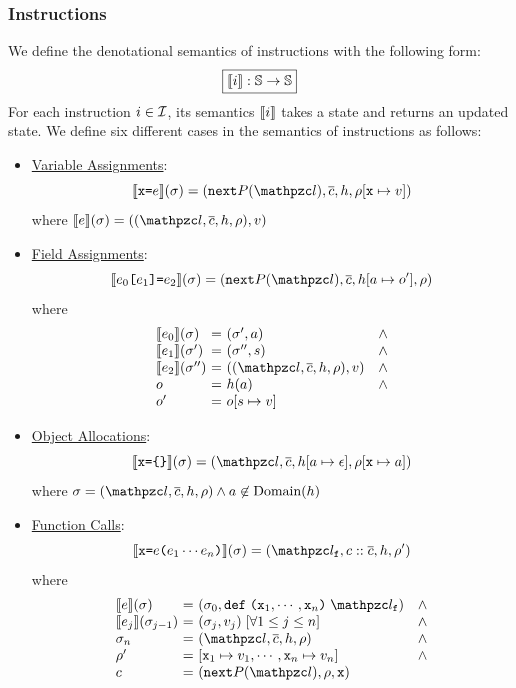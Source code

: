 \documentclass[10pt,conference]{IEEEtran}
\begin{document}
\subsubsection{Instructions} We define the denotational semantics of instructions
with the following form:
\[
  \framebox{$\sem{\inst}: \stset \rightarrow \stset$}
\]
For each instruction $i \in \mathcal{I}$, its semantics $\llbracket{i}\rrbracket$ takes a
state and returns an updated state. We define six different cases in the
semantics of instructions as follows:

\begin{itemize}
  \item \underline{Variable Assignments}:
    \[
      \sem{\varx \kweq \expr}(\st) =
      (\getnext{\prog}(\lab), \ctxts, \heap, \env[\varx \mapsto \val])
    \]
    where $\sem{\expr}(\st) = ((\lab, \ctxts, \heap, \env), \val)$

  \item \underline{Field Assignments}:
    \[
      \sem{\expr_0 \kwsl \expr_1 \kwsr \kweq \expr_2}(\st) =
      (\getnext{\prog}(\lab), \ctxts, \heap[\addr \mapsto \obj'], \env)
    \]
    where
    \[
      \begin{array}{l@{~}c@{~}ll}
        \sem{\expr_0}(\st) &=& (\st', \addr) &\wedge\\
        \sem{\expr_1}(\st') &=& (\st'', \str) &\wedge\\
        \sem{\expr_2}(\st'') &=& ((\lab, \ctxts, \heap, \env), \val) &\wedge\\
        \obj &=& \heap(\addr) &\wedge\\
        \obj' &=& \obj[\str \mapsto \val]\\
      \end{array}
    \]

  \item \underline{Object Allocations}:
    \[
      \sem{\varx \kweq \kwcl \kwcr}(\st) =
      (\lab, \ctxts, \heap[\addr \mapsto \epsilon], \env[\varx \mapsto
      \addr])
    \]
    where $\st = (\lab, \ctxts, \heap, \env) \wedge \addr \not\in
    \text{Domain}(\heap)$

  \item \underline{Function Calls}:
    \[
      \sem{\varx \kweq \expr \kwrl \expr_1 \cdots \expr_n \kwrr}(\st) =
      (\lab_\varf, \ctxt :: \ctxts, \heap, \env')
    \]
    where
    \[
      \begin{array}{l@{~}c@{~}ll}
        \sem{\expr}(\st) &=& (\st_0, \kwdef \; \kwrl \varx_1, \cdots, \varx_n
        \kwrr \; \lab_\varf) &\wedge\\
        \sem{\expr_j}(\st_{j-1}) &=& (\st_j, \val_j) \;
        [\forall 1 \leq j \leq n] &\wedge\\
        \st_n &=& (\lab, \ctxts, \heap, \env) &\wedge\\
        \env' &=& [\varx_1 \mapsto \val_1, \cdots, \varx_n \mapsto \val_n]
        &\wedge\\
        \ctxt &=& (\getnext{\prog}(\lab), \env, \varx)\\
      \end{array}
    \]


\end{itemize}
\end{document}
